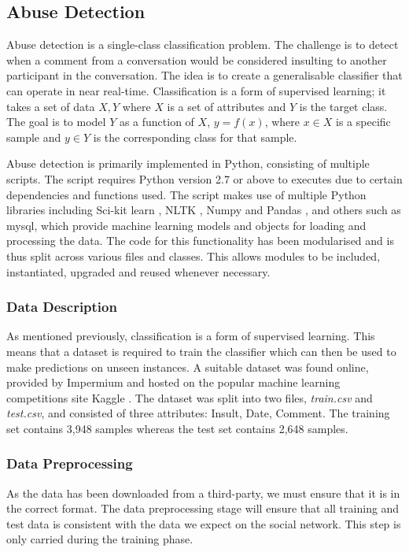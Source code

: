 \subsection{Abuse Detection}
Abuse detection is a single-class classification problem. The challenge is to detect when a comment from a conversation would be considered insulting to another participant in the conversation. The idea is to create a generalisable classifier that can operate in near real-time. Classification is a form of supervised learning; it takes a set of data ${X, Y}$ where $X$ is a set of attributes and $Y$ is the target class. The goal is to model $Y$ as a function of $X$, $y = f(x)$, where $x \in X$ is a specific sample and $y \in Y$ is the corresponding class for that sample.

Abuse detection is primarily implemented in Python, consisting of multiple scripts. The script requires Python version 2.7 or above to executes due to certain dependencies and functions used. The script makes use of multiple Python libraries including Sci-kit learn \cite{scikit:home}, NLTK \cite{nltk}, Numpy \cite{Numpy} and Pandas \cite{Pandas}, and others such as mysql, which provide machine learning models and objects for loading and processing the data. The code for this functionality has been modularised and is thus split across various files and classes. This allows modules to be included, instantiated, upgraded and reused whenever necessary.

\subsubsection{Data Description}
As mentioned previously, classification is a form of supervised learning. This means that a dataset is required to train the classifier which can then be used to make predictions on unseen instances. A suitable dataset was found online, provided by Impermium and hosted on the popular machine learning competitions site Kaggle \cite{Kaggle:Dataset}. The dataset was split into two files, \emph{train.csv} and \emph{test.csv}, and consisted of three attributes: Insult, Date, Comment. The training set contains 3,948 samples whereas the test set contains 2,648 samples.


\subsubsection{Data Preprocessing}
As the data has been downloaded from a third-party, we must ensure that it is in the correct format. The data preprocessing stage will ensure that all training and test data is consistent with the data we expect on the social network. This step is only carried during the training phase.

